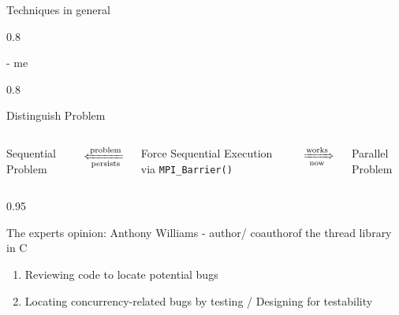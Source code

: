 \documentclass[aspectratio=1610]{beamer}
\newcommand{\Rplus}{\protect\hspace{-.1em}\protect\raisebox{.35ex}{\smaller{\smaller\textbf{+}}}}
\newcommand{\Cpp}{\mbox{C\Rplus\Rplus}\xspace}
\newenvironment{centeredblock}[2][0.8\textwidth]
{ %
	\begin{center}
		\begin{varwidth}{#1} %
			\begin{block}{#2}
				\centering
			}
			{ %
			\end{block}
		\end{varwidth}
	\end{center}
}
\begin{document}
	\begin{frame}[fragile]{Techniques in general}
		\begin{centeredblock}{}
			 - me 
		\end{centeredblock}
	
		\pause
		\begin{centeredblock}{Distinguish Problem}
			\begin{columns}
				\hfill
				\begin{column}{0.15 \textwidth}
					\begin{block}{}
						Sequential Problem
					\end{block}
				\end{column}
				\hfill
				$\xLeftarrow[\text{persists}]{\text{problem}}$ 
				\hfill
				\begin{column}{0.3 \textwidth}
					\begin{block}{}
						Force Sequential Execution via \texttt{MPI\_Barrier()}
					\end{block}
				\end{column}
				\hfill
				$\xRightarrow[\text{now}]{\text{works}}$
				\hfill
				\begin{column}{0.15 \textwidth}
					\begin{block}{}
						Parallel Problem
					\end{block}
				\end{column}
				\hfill
			\end{columns}
		\end{centeredblock}
		\pause
		\begin{centeredblock}[0.95 \textwidth]{The experts opinion: Anthony Williams - author/ coauthorof the thread library in \Cpp}
			\begin{enumerate}
				\item Reviewing code to locate potential bugs
				\item Locating concurrency-related bugs by testing / Designing for testability
			\end{enumerate}
		\end{centeredblock}
	\end{frame}
\end{document}
